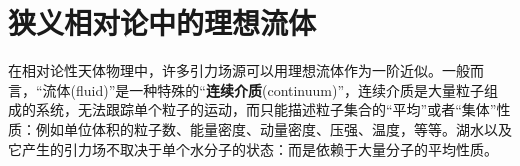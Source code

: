\chapter{狭义相对论中的理想流体}
\label{chap4}
在相对论性天体物理中，许多引力场源可以用理想流体作为一阶近似。一般而言，“流体(fluid)”是一种特殊的“\textbf{连续介质}(continuum)”，连续介质是大量粒子组成的系统，无法跟踪单个粒子的运动，而只能描述粒子集合的“平均”或者“集体”性质：例如单位体积的粒子数、能量密度、动量密度、压强、温度，等等。湖水以及它产生的引力场不取决于单个水分子的状态：而是依赖于大量分子的平均性质。